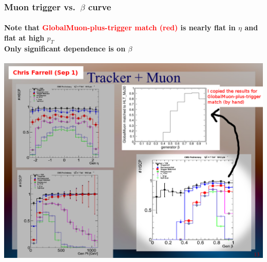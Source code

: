 \documentclass[compress]{beamer}
\begin{document}
\begin{frame}
\frametitle{Muon trigger vs.\ $\beta$ curve}
\framesubtitle{Note that \textcolor{red}{GlobalMuon-plus-trigger match (red)} is nearly flat in $\eta$ and flat at high $p_T$ \\ Only significant dependence is on $\beta$}

\begin{center}
\includegraphics[width=0.9\linewidth]{originslide.png}
\end{center}
\end{frame}
\end{document}
